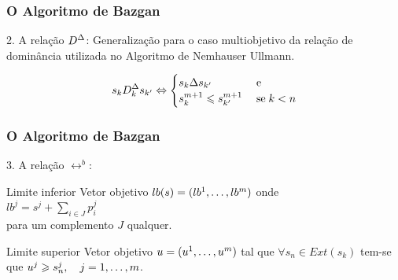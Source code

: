 \documentclass[10pt,xcolor=table,fleqn]{beamer}
\begin{document}
\begin{frame}
	\frametitle{O Algoritmo de Bazgan}
  \begin{block}{2. A relação $D^{\Delta}$:}
    Generalização para o caso multiobjetivo
    da relação de dominância utilizada no Algoritmo de Nemhauser Ullmann.
  \end{block}
  \pause
  \begin{displaymath}
    s_k D_k^{\Delta} s_{{k'}}
      \Leftrightarrow
      \begin{cases}
        s_k \Delta s_{{k'}} \; & \text{e} \\
        s_k^{m+1} \leqslant s_{{k'}}^{m+1} \; & \text{se} \; k < n
      \end{cases}
  \end{displaymath}
\end{frame}

\begin{frame}
	\frametitle{O Algoritmo de Bazgan}
  \begin{block}{3. A relação $\rel^{b}$:}\end{block}
  \begin{block}{Limite inferior}
    Vetor objetivo $lb(s) = (lb^1, \ldots, lb^m)$ onde \\
    \vspace*{2mm}
    \hspace*{4mm}
    $lb^j = s^j + \sum_{i \in J}{p_i^j}$
    \\
    \vspace{2mm}
    para um complemento $J$ qualquer.
  \end{block}
  \pause
  \vspace{5mm}
  \begin{block}{Limite superior}
    Vetor objetivo $u = (u^1, \ldots, u^m)$ tal que $\forall s_n \in Ext(s_k)$
    tem-se que $u^j \geqslant s_n^j, \quad j = 1, \ldots, m$.
  \end{block}
\end{frame}
\end{document}
